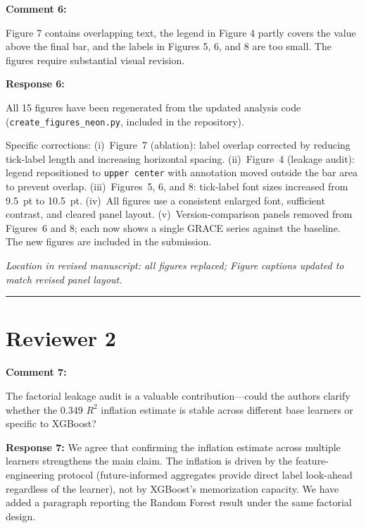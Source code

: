 \documentclass[11pt]{article}
\newcommand{\rev}[1]{{\color{ccolor}#1}}
\begin{document}
\bigskip

\textbf{Comment 6:}
\begin{rquote}
Figure 7 contains overlapping text, the legend in Figure 4 partly covers the value
above the final bar, and the labels in Figures 5, 6, and 8 are too small. The figures
require substantial visual revision.
\end{rquote}

\textbf{Response 6:}
\begin{sloppypar}
All 15 figures have been regenerated from the updated analysis code
(\texttt{create\_figures\_neon.py}, included in the repository).
\end{sloppypar}

\begin{sloppypar}
\rev{Specific corrections: (i)~Figure~7 (ablation): label overlap corrected by
reducing tick-label length and increasing horizontal spacing. (ii)~Figure~4 (leakage
audit): legend repositioned to \texttt{upper center} with annotation moved outside
the bar area to prevent overlap. (iii)~Figures~5, 6, and 8: tick-label font sizes
increased from 9.5~pt to 10.5~pt. (iv)~All figures use a consistent enlarged font,
sufficient contrast, and cleared panel layout. (v)~Version-comparison panels removed
from Figures~6 and 8; each now shows a single GRACE series against the baseline.
The new figures are included in the submission.}
\end{sloppypar}

\textit{Location in revised manuscript: all figures replaced; Figure captions updated
to match revised panel layout.}

\bigskip
\hrule

\section*{Reviewer 2}

\bigskip

\textbf{Comment 7:}
\begin{rquote}
The factorial leakage audit is a valuable contribution---could the authors clarify
whether the 0.349 $R^2$ inflation estimate is stable across different base learners
or specific to XGBoost?
\end{rquote}

\textbf{Response 7:}
We agree that confirming the inflation estimate across multiple learners strengthens
the main claim. The inflation is driven by the feature-engineering protocol (future-informed aggregates
provide direct label look-ahead regardless of the learner), not by XGBoost's
memorization capacity. We have added a paragraph reporting the Random Forest result
under the same factorial design.
\end{document}

